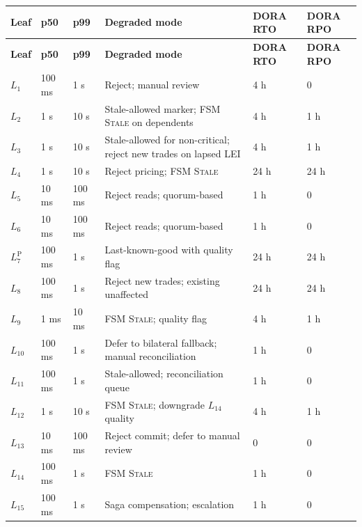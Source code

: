 \documentclass[11pt,a4paper]{article}
\begin{document}
\begin{center}
\renewcommand{\arraystretch}{1.05}
\begin{longtable}{@{}p{1.0cm}p{1.6cm}p{1.6cm}p{6.0cm}p{1.4cm}p{1.4cm}@{}}
\toprule
\textbf{Leaf} & \textbf{p50} & \textbf{p99} & \textbf{Degraded mode} & \textbf{DORA RTO} & \textbf{DORA RPO} \\
\midrule
\endfirsthead
\toprule
\textbf{Leaf} & \textbf{p50} & \textbf{p99} & \textbf{Degraded mode} & \textbf{DORA RTO} & \textbf{DORA RPO} \\
\midrule
\endhead
\bottomrule
\endfoot
$L_1$    & 100 ms & 1 s    & Reject; manual review                                & 4 h  & 0    \\
$L_2$    & 1 s    & 10 s   & Stale-allowed marker; FSM \textsc{Stale} on dependents& 4 h  & 1 h  \\
$L_3$    & 1 s    & 10 s   & Stale-allowed for non-critical; reject new trades on lapsed LEI & 4 h  & 1 h  \\
$L_4$    & 1 s    & 10 s   & Reject pricing; FSM \textsc{Stale}                  & 24 h & 24 h \\
$L_5$    & 10 ms  & 100 ms & Reject reads; quorum-based                          & 1 h  & 0    \\
$L_6$    & 10 ms  & 100 ms & Reject reads; quorum-based                          & 1 h  & 0    \\
$L_7^{\mathrm{P}}$ & 100 ms & 1 s & Last-known-good with quality flag             & 24 h & 24 h \\
$L_8$    & 100 ms & 1 s    & Reject new trades; existing unaffected               & 24 h & 24 h \\
$L_9$    & 1 ms   & 10 ms  & FSM \textsc{Stale}; quality flag                     & 4 h  & 1 h  \\
$L_{10}$ & 100 ms & 1 s    & Defer to bilateral fallback; manual reconciliation   & 1 h  & 0    \\
$L_{11}$ & 100 ms & 1 s    & Stale-allowed; reconciliation queue                  & 1 h  & 0    \\
$L_{12}$ & 1 s    & 10 s   & FSM \textsc{Stale}; downgrade $L_{14}$ quality       & 4 h  & 1 h  \\
$L_{13}$ & 10 ms  & 100 ms & Reject commit; defer to manual review                & 0    & 0    \\
$L_{14}$ & 100 ms & 1 s    & FSM \textsc{Stale}                                   & 1 h  & 0    \\
$L_{15}$ & 100 ms & 1 s    & Saga compensation; escalation                        & 1 h  & 0    \\

\end{longtable}
\end{center}
\end{document}
